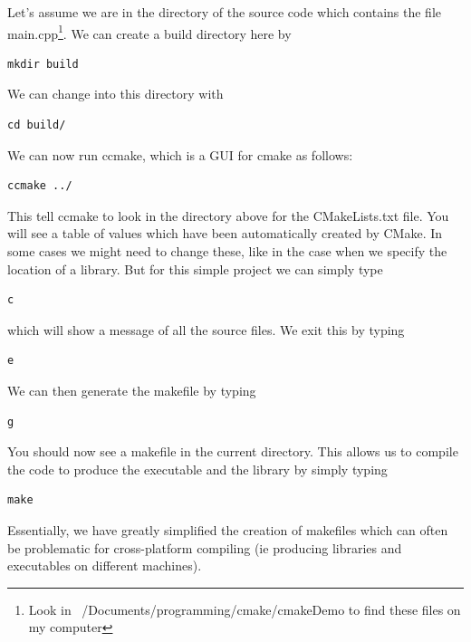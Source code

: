 Let's assume we are in the directory of the source code which contains
the file main.cpp\footnote{Look in ~/Documents/programming/cmake/cmakeDemo to find these files on my computer}. We can create a build directory here by 
\begin{verbatim}
mkdir build
\end{verbatim}
We can change into this directory with
\begin{verbatim}
cd build/
\end{verbatim}
We can now run ccmake, which is a GUI for cmake as follows:
\begin{verbatim}
ccmake ../
\end{verbatim}
This tell ccmake to look in the directory above for the CMakeLists.txt
file. You will see a table of values which have been automatically
created by CMake. In some cases we might need to change these, like in
the case when we specify the location of a library. But for this
simple project we can simply type
\begin{verbatim}
c
\end{verbatim}
which will show a message of all the source files. We exit this by
typing
\begin{verbatim}
e
\end{verbatim}
We can then generate the makefile by typing
\begin{verbatim}
g
\end{verbatim}
You should now see a makefile in the current directory. This allows us
to compile the code to produce the executable and the library by
simply typing
\begin{verbatim}
make
\end{verbatim}

Essentially, we have greatly simplified the creation of makefiles
which can often be problematic for cross-platform compiling (ie
producing libraries and executables on different machines).

